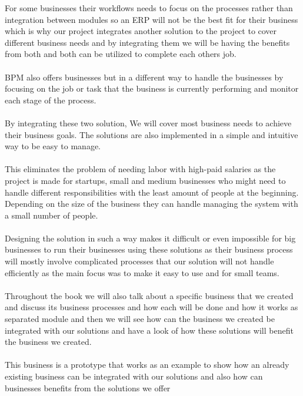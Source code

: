 For some businesses their workflows needs to focus on the processes rather than integration between modules so 
an ERP will not be the best fit for their business which is why our project integrates another solution to the 
project to cover different business needs and by integrating them we will be having the benefits from both and 
both can be utilized to complete each others job.\\\\
BPM also offers businesses but in a different way to handle the businesses by focusing on the job or task that the business 
is currently performing and monitor each stage of the process.\\\\
By integrating these two solution, We will cover most business needs to achieve their business goals. 
The solutions are also implemented in a simple and intuitive way to be easy to manage.\\\\
This eliminates the problem of needing labor with high-paid salaries as the project is made for startups, small and medium businesses who might need to handle 
different responsibilities with the least amount of people at the beginning. Depending on the size of the business they can handle managing the system with a small number 
of people. \\\\
Designing the solution in such a way makes it difficult or even impossible for big businesses to run their businesses using these solutions 
as their business process will mostly involve complicated processes that our solution will not handle efficiently as the main focus 
was to make it easy to use and for small teams.\\\\
Throughout the book we will also talk about a specific business that we created and discuss its business processes and how each 
will be done and how it works as separated module and then we will see how can the business we created be integrated with our solutions 
and have a look of how these solutions will benefit the business we created. \\\\
This business is a prototype that works as an example to show how an already existing business can be integrated with our solutions 
and also how can businesses benefits from the solutions we offer







